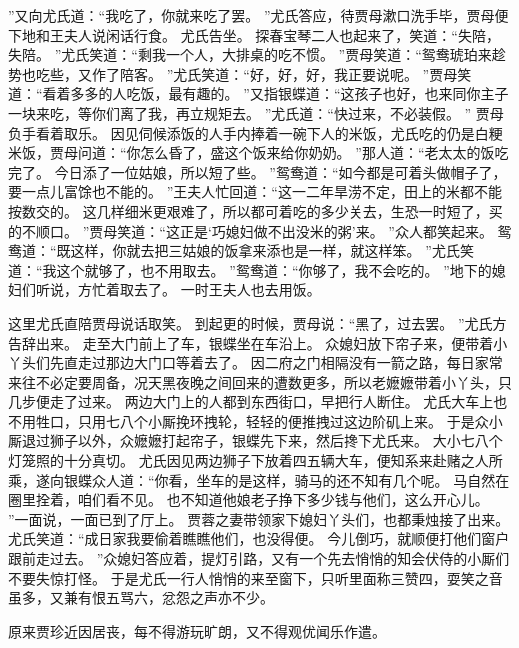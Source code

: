 ”又向尤氏道：“我吃了，你就来吃了罢。
”尤氏答应，待贾母漱口洗手毕，贾母便下地和王夫人说闲话行食。
尤氏告坐。
探春宝琴二人也起来了，笑道：“失陪，失陪。
”尤氏笑道：“剩我一个人，大排桌的吃不惯。
”贾母笑道：“鸳鸯琥珀来趁势也吃些，又作了陪客。
”尤氏笑道：“好，好，好，我正要说呢。
”贾母笑道：“看着多多的人吃饭，最有趣的。
”又指银蝶道：“这孩子也好，也来同你主子一块来吃，等你们离了我，再立规矩去。
”尤氏道：“快过来，不必装假。
”
贾母负手看着取乐。
因见伺候添饭的人手内捧着一碗下人的米饭，尤氏吃的仍是白粳米饭，贾母问道：“你怎么昏了，盛这个饭来给你奶奶。
”那人道：“老太太的饭吃完了。
今日添了一位姑娘，所以短了些。
”鸳鸯道：“如今都是可着头做帽子了，要一点儿富馀也不能的。
”王夫人忙回道：“这一二年旱涝不定，田上的米都不能按数交的。
这几样细米更艰难了，所以都可着吃的多少关去，生恐一时短了，买的不顺口。
”贾母笑道：“这正是‘巧媳妇做不出没米的粥’来。
”众人都笑起来。
鸳鸯道：“既这样，你就去把三姑娘的饭拿来添也是一样，就这样笨。
”尤氏笑道：“我这个就够了，也不用取去。
”鸳鸯道：“你够了，我不会吃的。
”地下的媳妇们听说，方忙着取去了。
一时王夫人也去用饭。
\par
这里尤氏直陪贾母说话取笑。
到起更的时候，贾母说：“黑了，过去罢。
”尤氏方告辞出来。
走至大门前上了车，银蝶坐在车沿上。
众媳妇放下帘子来，便带着小丫头们先直走过那边大门口等着去了。
因二府之门相隔没有一箭之路，每日家常来往不必定要周备，况天黑夜晚之间回来的遭数更多，所以老嬷嬷带着小丫头，只几步便走了过来。
两边大门上的人都到东西街口，早把行人断住。
尤氏大车上也不用牲口，只用七八个小厮挽环拽轮，轻轻的便推拽过这边阶矶上来。
于是众小厮退过狮子以外，众嬷嬷打起帘子，银蝶先下来，然后搀下尤氏来。
大小七八个灯笼照的十分真切。
尤氏因见两边狮子下放着四五辆大车，便知系来赴赌之人所乘，遂向银蝶众人道：“你看，坐车的是这样，骑马的还不知有几个呢。
马自然在圈里拴着，咱们看不见。
也不知道他娘老子挣下多少钱与他们，这么开心儿。
”一面说，一面已到了厅上。
贾蓉之妻带领家下媳妇丫头们，也都秉烛接了出来。
尤氏笑道：“成日家我要偷着瞧瞧他们，也没得便。
今儿倒巧，就顺便打他们窗户跟前走过去。
”众媳妇答应着，提灯引路，又有一个先去悄悄的知会伏侍的小厮们不要失惊打怪。
于是尤氏一行人悄悄的来至窗下，只听里面称三赞四，耍笑之音虽多，又兼有恨五骂六，忿怨之声亦不少。
\par
原来贾珍近因居丧，每不得游玩旷朗，又不得观优闻乐作遣。
